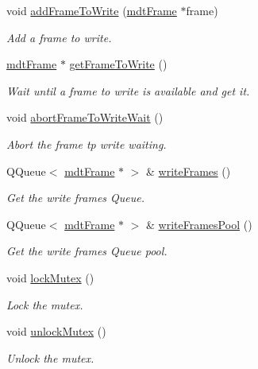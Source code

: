 \begin{DoxyCompactItemize}
void \hyperlink{classmdt_abstract_port_a9a69eb2fc07d551ab37c011487fa319d}{addFrameToWrite} (\hyperlink{classmdt_frame}{mdtFrame} $\ast$frame)
\begin{DoxyCompactList}\small\item\em Add a frame to write. \end{DoxyCompactList}\item 
\hyperlink{classmdt_frame}{mdtFrame} $\ast$ \hyperlink{classmdt_abstract_port_a6c5ebd4451aec959efc4e71ab1b13941}{getFrameToWrite} ()
\begin{DoxyCompactList}\small\item\em Wait until a frame to write is available and get it. \end{DoxyCompactList}\item 
void \hyperlink{classmdt_abstract_port_ae67c815f68317c70e398eaa86622af6b}{abortFrameToWriteWait} ()
\begin{DoxyCompactList}\small\item\em Abort the frame tp write waiting. \end{DoxyCompactList}\item 
QQueue$<$ \hyperlink{classmdt_frame}{mdtFrame} $\ast$ $>$ \& \hyperlink{classmdt_abstract_port_a4fed10be147dfce6ca315467ff3fb968}{writeFrames} ()
\begin{DoxyCompactList}\small\item\em Get the write frames Queue. \end{DoxyCompactList}\item 
QQueue$<$ \hyperlink{classmdt_frame}{mdtFrame} $\ast$ $>$ \& \hyperlink{classmdt_abstract_port_abf093b67fddebffa4f3c52277b9a8cf7}{writeFramesPool} ()
\begin{DoxyCompactList}\small\item\em Get the write frames Queue pool. \end{DoxyCompactList}\item 
\hypertarget{classmdt_abstract_port_a6bf2ecdcf894da3929a22eb8793a9fe3}{
void \hyperlink{classmdt_abstract_port_a6bf2ecdcf894da3929a22eb8793a9fe3}{lockMutex} ()}
\label{classmdt_abstract_port_a6bf2ecdcf894da3929a22eb8793a9fe3}

\begin{DoxyCompactList}\small\item\em Lock the mutex. \end{DoxyCompactList}\item 
\hypertarget{classmdt_abstract_port_a3523c72a06e4d950338f91e56c286e84}{
void \hyperlink{classmdt_abstract_port_a3523c72a06e4d950338f91e56c286e84}{unlockMutex} ()}
\label{classmdt_abstract_port_a3523c72a06e4d950338f91e56c286e84}

\begin{DoxyCompactList}\small\item\em Unlock the mutex. \end{DoxyCompactList}\end{DoxyCompactItemize}

